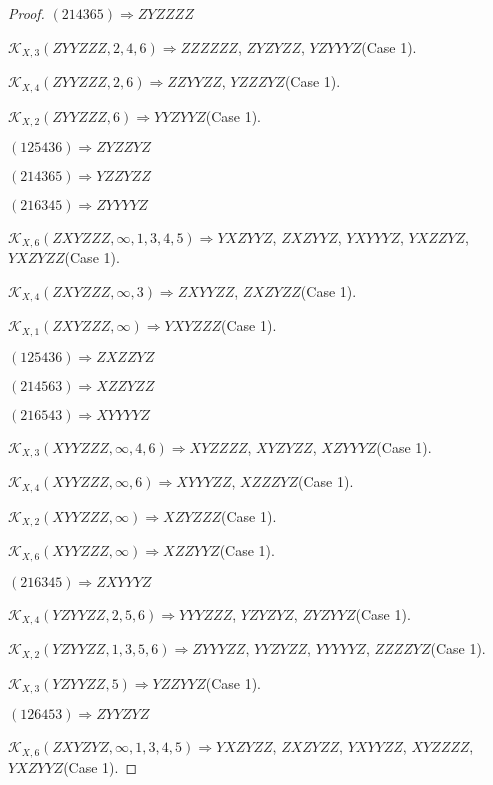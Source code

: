 \documentclass[12pt]{article}
\theoremstyle{plain}
\theoremstyle{definition}
\theoremstyle{remark}
\newcommand{\fancy}[1]{\mathcal{#1}}
\def\K{\fancy{K}}
\begin{document}
\begin{proof}
	$(2 1 4 3 6 5)\Rightarrow ZYZZZZ$
	
	
	
	$\K_{X,3}(ZYYZZZ,2, 4, 6)\Rightarrow $$ZZZZZZ$, $ZYZYZZ$, $YZYYYZ$(Case 1).
	
	$\K_{X,4}(ZYYZZZ,2, 6)\Rightarrow $$ZZYYZZ$, $YZZZYZ$(Case 1).
	
	$\K_{X,2}(ZYYZZZ,6)\Rightarrow $$YYZYYZ$(Case 1).
	
	
	
	$(1 2 5 4 3 6)\Rightarrow ZYZZYZ$
	
	$(2 1 4 3 6 5)\Rightarrow YZZYZZ$
	
	$(2 1 6 3 4 5)\Rightarrow ZYYYYZ$
	
	
	
	$\K_{X,6}(ZXYZZZ,\infty,1, 3, 4, 5)\Rightarrow $$YXZYYZ$, $ZXZYYZ$, $YXYYYZ$, $YXZZYZ$, $YXZYZZ$(Case 1).
	
	$\K_{X,4}(ZXYZZZ,\infty,3)\Rightarrow $$ZXYYZZ$, $ZXZYZZ$(Case 1).
	
	$\K_{X,1}(ZXYZZZ,\infty)\Rightarrow $$YXYZZZ$(Case 1).
	
	
	
	$(1 2 5 4 3 6)\Rightarrow ZXZZYZ$
	
	$(2 1 4 5 6 3)\Rightarrow XZZYZZ$
	
	$(2 1 6 5 4 3)\Rightarrow XYYYYZ$
	
	
	
	$\K_{X,3}(XYYZZZ,\infty,4, 6)\Rightarrow $$XYZZZZ$, $XYZYZZ$, $XZYYYZ$(Case 1).
	
	$\K_{X,4}(XYYZZZ,\infty,6)\Rightarrow $$XYYYZZ$, $XZZZYZ$(Case 1).
	
	$\K_{X,2}(XYYZZZ,\infty)\Rightarrow $$XZYZZZ$(Case 1).
	
	$\K_{X,6}(XYYZZZ,\infty)\Rightarrow $$XZZYYZ$(Case 1).
	
	
	
	$(2 1 6 3 4 5)\Rightarrow ZXYYYZ$
	
	
	
	$\K_{X,4}(YZYYZZ,2, 5, 6)\Rightarrow $$YYYZZZ$, $YZYZYZ$, $ZYZYYZ$(Case 1).
	
	$\K_{X,2}(YZYYZZ,1, 3, 5, 6)\Rightarrow $$ZYYYZZ$, $YYZYZZ$, $YYYYYZ$, $ZZZZYZ$(Case 1).
	
	$\K_{X,3}(YZYYZZ,5)\Rightarrow $$YZZYYZ$(Case 1).
	
	
	
	$(1 2 6 4 5 3)\Rightarrow ZYYZYZ$
	
	
	
	$\K_{X,6}(ZXYZYZ,\infty,1, 3, 4, 5)\Rightarrow $$YXZYZZ$, $ZXZYZZ$, $YXYYZZ$, $XYZZZZ$, $YXZYYZ$(Case 1).
	

\end{proof}
\end{document}
